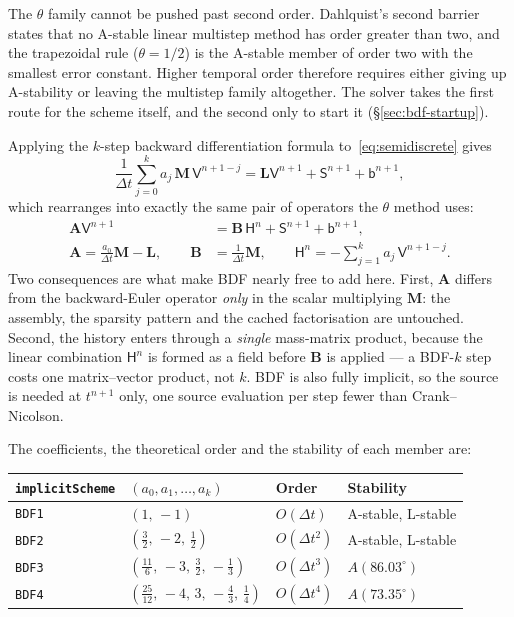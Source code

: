 \documentclass[11pt,a4paper]{article}
\newcommand{\code}[1]{\texttt{\small #1}}
\newcommand{\Mmass}{\mathbf{M}}
\newcommand{\Lop}{\mathbf{L}}
\newcommand{\Aimp}{\mathbf{A}}
\newcommand{\Bimp}{\mathbf{B}}
\begin{document}
The $\theta$ family cannot be pushed past second order. Dahlquist's second
barrier states that no A-stable linear multistep method has order greater than
two, and the trapezoidal rule ($\theta=1/2$) is the A-stable member of order two
with the smallest error constant. Higher temporal order therefore requires
either giving up A-stability or leaving the multistep family altogether. The
solver takes the first route for the scheme itself, and the second only to start
it (\S\ref{sec:bdf-startup}).

Applying the $k$-step backward differentiation formula
to~\eqref{eq:semidiscrete} gives
\begin{equation}
  \frac{1}{\Delta t}\sum_{j=0}^{k} a_j\,\Mmass\,\mathsf{V}^{n+1-j}
  =
  \Lop\mathsf{V}^{n+1}+\mathsf{S}^{n+1}+\mathsf{b}^{n+1},
  \label{eq:bdf}
\end{equation}
which rearranges into exactly the same pair of operators the $\theta$ method
uses:
\begin{align}
  \Aimp \mathsf{V}^{n+1}
  &=
  \Bimp\,\mathsf{H}^{n}+\mathsf{S}^{n+1}+\mathsf{b}^{n+1},
  \label{eq:bdf-system}\\
  \Aimp = \frac{a_0}{\Delta t}\Mmass-\Lop,
  \qquad
  \Bimp &= \frac{1}{\Delta t}\Mmass,
  \qquad
  \mathsf{H}^{n} = -\sum_{j=1}^{k} a_j\,\mathsf{V}^{n+1-j}.
\end{align}
Two consequences are what make BDF nearly free to add here. First, $\Aimp$
differs from the backward-Euler operator \emph{only} in the scalar multiplying
$\Mmass$: the assembly, the sparsity pattern and the cached factorisation are
untouched. Second, the history enters through a \emph{single} mass-matrix
product, because the linear combination $\mathsf{H}^n$ is formed as a field
before $\Bimp$ is applied --- a BDF-$k$ step costs one matrix--vector product,
not $k$. BDF is also fully implicit, so the source is needed at $t^{n+1}$ only,
one source evaluation per step fewer than Crank--Nicolson.

The coefficients, the theoretical order and the stability of each member are:
\begin{center}
\begin{tabular}{@{}llll@{}}
\toprule
\code{implicitScheme} & $(a_0,a_1,\dots,a_k)$ & Order & Stability \\
\midrule
\code{BDF1} & $(1,\,-1)$ & $O(\Delta t)$ & A-stable, L-stable \\
\code{BDF2} & $(\tfrac32,\,-2,\,\tfrac12)$ & $O(\Delta t^2)$ & A-stable, L-stable \\
\code{BDF3} & $(\tfrac{11}{6},\,-3,\,\tfrac32,\,-\tfrac13)$ & $O(\Delta t^3)$ & $A(86.03^\circ)$ \\
\code{BDF4} & $(\tfrac{25}{12},\,-4,\,3,\,-\tfrac43,\,\tfrac14)$ & $O(\Delta t^4)$ & $A(73.35^\circ)$ \\
\bottomrule
\end{tabular}
\end{center}
\end{document}
